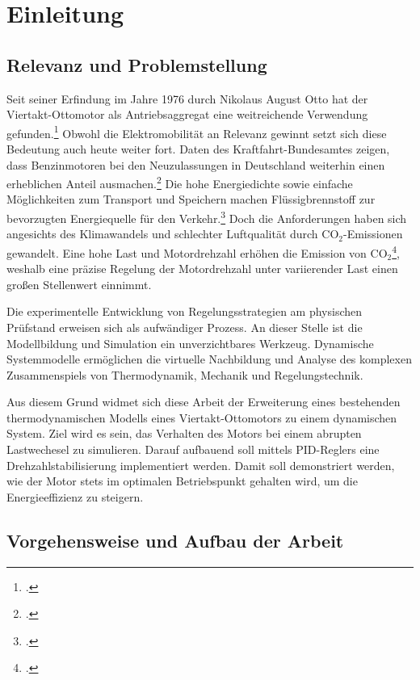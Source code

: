 \section{Einleitung}

\subsection{Relevanz und Problemstellung}
Seit seiner Erfindung im Jahre 1976 durch Nikolaus August Otto hat der Viertakt-Ottomotor als Antriebsaggregat eine weitreichende Verwendung gefunden.\footcite[Vgl.][1]{merker2019} 
Obwohl die Elektromobilität an Relevanz gewinnt setzt sich diese Bedeutung auch heute weiter fort.
Daten des Kraftfahrt-Bundesamtes zeigen, dass Benzinmotoren bei den Neuzulassungen in Deutschland weiterhin einen erheblichen Anteil ausmachen.\footcite[Vgl.][]{kba2025}
Die hohe Energiedichte sowie einfache Möglichkeiten zum Transport und Speichern machen Flüssigbrennstoff zur bevorzugten Energiequelle für den Verkehr.\footcite[Vgl.][2]{leach2020}
Doch die Anforderungen haben sich angesichts des Klimawandels und schlechter Luftqualität durch $\text{CO}_2$-Emissionen gewandelt.
Eine hohe Last und Motordrehzahl erhöhen die Emission von $\text{CO}_2$\footcite[Vgl.][6]{shahad2015}, weshalb eine präzise Regelung der Motordrehzahl unter variierender Last einen großen Stellenwert einnimmt.

Die experimentelle Entwicklung von Regelungsstrategien am physischen Prüfstand erweisen sich als aufwändiger Prozess.
An dieser Stelle ist die Modellbildung und Simulation ein unverzichtbares Werkzeug.
Dynamische Systemmodelle ermöglichen die virtuelle Nachbildung und Analyse des komplexen Zusammenspiels von Thermodynamik, Mechanik und Regelungstechnik.

Aus diesem Grund widmet sich diese Arbeit der Erweiterung eines bestehenden thermodynamischen Modells eines Viertakt-Ottomotors zu einem dynamischen System.
Ziel wird es sein, das Verhalten des Motors bei einem abrupten Lastwechesel zu simulieren.
Darauf aufbauend soll mittels PID-Reglers eine Drehzahlstabilisierung implementiert werden.
Damit soll demonstriert werden, wie der Motor stets im optimalen Betriebspunkt gehalten wird, um die Energieeffizienz zu steigern.

\subsection{Vorgehensweise und Aufbau der Arbeit}

